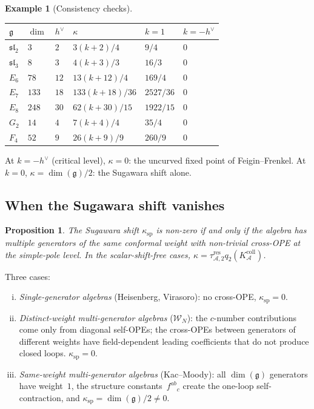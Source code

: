 \documentclass[11pt,reqno]{amsart}
\newtheorem{proposition}[theorem]{Proposition}
\theoremstyle{definition}
\newtheorem{example}[theorem]{Example}
\theoremstyle{remark}
\newcommand{\cA}{\mathcal{A}}
\newcommand{\cW}{\mathcal{W}}
\newcommand{\fg}{\mathfrak{g}}
\numberwithin{equation}{section}
\begin{document}
\begin{example}[Consistency checks]\label{ex:km-checks}
\begin{center}
\begin{tabular}{@{}llllll@{}}
\toprule
$\fg$ & $\dim$ & $h^\vee$ & $\kappa$ & $k=1$ &
 $k=-h^\vee$ \\
\midrule
$\mathfrak{sl}_2$ & $3$ & $2$ & $3(k{+}2)/4$ & $9/4$ & $0$ \\
$\mathfrak{sl}_3$ & $8$ & $3$ & $4(k{+}3)/3$ & $16/3$ & $0$ \\
$E_6$ & $78$ & $12$ & $13(k{+}12)/4$ & $169/4$ & $0$ \\
$E_7$ & $133$ & $18$ & $133(k{+}18)/36$ & $2527/36$ & $0$ \\
$E_8$ & $248$ & $30$ & $62(k{+}30)/15$ & $1922/15$ & $0$ \\
$G_2$ & $14$ & $4$ & $7(k{+}4)/4$ & $35/4$ & $0$ \\
$F_4$ & $52$ & $9$ & $26(k{+}9)/9$ & $260/9$ & $0$ \\
\bottomrule
\end{tabular}
\end{center}
At $k = -h^\vee$ (critical level), $\kappa = 0$: the
uncurved fixed point of Feigin--Frenkel.
At $k = 0$, $\kappa = \dim(\fg)/2$: the Sugawara shift
alone.
\end{example}

\subsection{When the Sugawara shift vanishes}
\label{subsec:sugawara-vanishing}

\begin{proposition}\label{prop:sugawara-vanishing}
The Sugawara shift $\kappa_{\mathrm{sp}}$ is non-zero if and
only if the algebra has multiple generators of the same
conformal weight with non-trivial cross-OPE at the
simple-pole level. In the scalar-shift-free cases,
$\kappa=\tau_{\cA,2}^{\mathrm{res}}q_2(K_\cA^{\mathrm{coll}})$.
\end{proposition}

Three cases:

\begin{enumerate}[(i)]
\item \emph{Single-generator algebras}
 (Heisenberg, Virasoro): no cross-OPE,
 $\kappa_{\mathrm{sp}} = 0$.

\item \emph{Distinct-weight multi-generator algebras}
 ($\cW_N$): the $c$-number contributions come only from
 diagonal self-OPEs; the cross-OPEs between generators of
 different weights have field-dependent leading coefficients
 that do not produce closed loops.
 $\kappa_{\mathrm{sp}} = 0$.

\item \emph{Same-weight multi-generator algebras}
 (Kac--Moody): all $\dim(\fg)$ generators have weight~$1$,
 the structure constants~$f^{ab}{}_c$ create the one-loop
 self-contraction, and
 $\kappa_{\mathrm{sp}} = \dim(\fg)/2 \neq 0$.
\end{enumerate}
\end{document}

